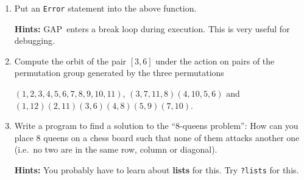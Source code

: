 \documentclass[12pt]{article}
\newcommand{\GAP}{\textsf{GAP}}
\begin{document}
\begin{enumerate}
\textbf{Hints:} Read about the \texttt{for} and \texttt{while} and
\texttt{if} commands.
\item Put an \texttt{Error} statement into the above function.

\textbf{Hints:} \GAP\ enters a break loop during execution.
This is very useful for debugging.
\item Compute the orbit of the pair $[3,6]$ under the action on pairs
of the permutation group generated by the three permutations

\vspace*{-5mm}
\begin{center}{\small
$(1,2,3,4,5,6,7,8,9,10,11)$, $(3,7,11,8)(4,10,5,6)$ and
$(1,12)(2,11)(3,6)(4,8)(5,9)(7,10)$.}
\end{center}

\vspace*{-5mm}
\item Write a program to find a solution to the ``$8$-queens problem'': How
can you place $8$ queens on a chess board such that none of them attacks
another one (i.e.~no two are in the same row, column or diagonal). 

\textbf{Hints:} You probably have to learn about \textbf{lists} for this.
Try \texttt{?lists} for this.
\end{enumerate}
\end{document}
